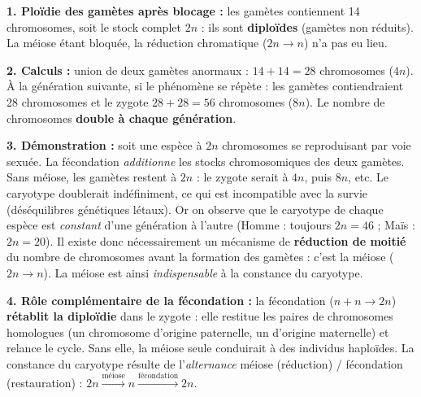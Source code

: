\documentclass[11pt]{article}
\newcommand{\cle}[1]{{\popxbold\color{popdark}#1}}
\begin{document}
\begin{corrige}
\textbf{1. Ploïdie des gamètes après blocage :} les gamètes contiennent 14 chromosomes, soit le stock complet $2n$ : ils sont \textbf{diploïdes} (gamètes non réduits). La méiose étant bloquée, la réduction chromatique ($2n \rightarrow n$) n'a pas eu lieu.

\textbf{2. Calculs :} union de deux gamètes anormaux : $14 + 14 = 28$ chromosomes ($4n$). À la génération suivante, si le phénomène se répète : les gamètes contiendraient 28 chromosomes et le zygote $28 + 28 = 56$ chromosomes ($8n$). Le nombre de chromosomes \textbf{double à chaque génération}.

\textbf{3. Démonstration :} soit une espèce à $2n$ chromosomes se reproduisant par voie sexuée. La fécondation \emph{additionne} les stocks chromosomiques des deux gamètes. Sans méiose, les gamètes restent à $2n$ : le zygote serait à $4n$, puis $8n$, etc. Le caryotype doublerait indéfiniment, ce qui est incompatible avec la survie (déséquilibres génétiques létaux). Or on observe que le caryotype de chaque espèce est \emph{constant} d'une génération à l'autre (Homme : toujours $2n = 46$ ; Maïs : $2n = 20$). Il existe donc nécessairement un mécanisme de \textbf{réduction de moitié} du nombre de chromosomes avant la formation des gamètes : c'est la \cle{méiose} ($2n \rightarrow n$). La méiose est ainsi \emph{indispensable} à la constance du caryotype.

\textbf{4. Rôle complémentaire de la fécondation :} la fécondation ($n + n \rightarrow 2n$) \textbf{rétablit la diploïdie} dans le zygote : elle restitue les paires de chromosomes homologues (un chromosome d'origine paternelle, un d'origine maternelle) et relance le cycle. Sans elle, la méiose seule conduirait à des individus haploïdes. La constance du caryotype résulte de l'\emph{alternance} méiose (réduction) / fécondation (restauration) : $2n \xrightarrow{\text{méiose}} n \xrightarrow{\text{fécondation}} 2n$.


\end{corrige}
\end{document}
